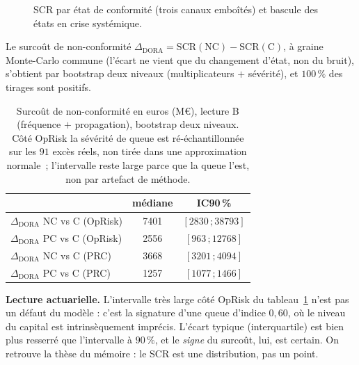 \begin{figure}[H]\centering
{}
\caption{SCR par état de conformité (trois canaux emboîtés) et bascule des états en crise
systémique.}
\label{fig:multietats}
\end{figure}

Le surcoût de non-conformité $\Delta_{\text{DORA}}=\mathrm{SCR}(\text{NC})-\mathrm{SCR}(\text{C})$,
à graine Monte-Carlo commune (l'écart ne vient que du changement d'état, non du bruit),
s'obtient par bootstrap deux niveaux (multiplicateurs $+$ sévérité), et $100\,\%$ des tirages
sont positifs.

\begin{table}[htbp]\centering\small
\renewcommand{\arraystretch}{1.25}
\begin{tabular}{@{}l cc@{}}
\toprule
& médiane & IC90\,\% \\
\midrule
$\Delta_{\text{DORA}}$ NC vs C (OpRisk) & 7401 & $[2830\,;38793]$ \\
$\Delta_{\text{DORA}}$ PC vs C (OpRisk) & 2556 & $[963\,;12768]$  \\
$\Delta_{\text{DORA}}$ NC vs C (PRC)    & 3668 & $[3201\,;4094]$  \\
$\Delta_{\text{DORA}}$ PC vs C (PRC)    & 1257 & $[1077\,;1466]$  \\
\bottomrule
\end{tabular}
\caption{Surcoût de non-conformité en euros (M\euro), lecture B (fréquence $+$ propagation),
bootstrap deux niveaux. Côté OpRisk la sévérité de queue est ré-échantillonnée sur les
$91$ excès réels, non tirée dans une approximation
normale~; l'intervalle reste large parce que la queue l'est, non par artefact de méthode.}
\label{tab:delta}
\end{table}

\noindent \textbf{Lecture actuarielle.} L'intervalle très large côté OpRisk du
tableau~\ref{tab:delta} n'est pas un défaut
du modèle : c'est la signature d'une queue d'indice $0{,}60$, où le niveau du capital est
intrinsèquement imprécis. L'écart typique (interquartile) est bien plus resserré que
l'intervalle à $90\,\%$, et le \emph{signe} du surcoût, lui, est certain. On retrouve la thèse du
mémoire : le SCR est une distribution, pas un point.

